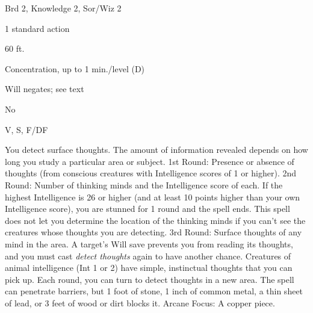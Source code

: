
\begin{description*}
\item[Level:] Brd 2, Knowledge 2, Sor/Wiz 2
\item[Casting Time:] 1 standard action
\item[Range:] 60 ft.
\item[Duration:] Concentration, up to 1 min./level (D)
\item[Saving Throw:] Will negates; see text
\item[Spell Resistance:] No
\item[Components:] V, S, F/DF
\end{description*}

You detect surface thoughts. The amount of information revealed depends on how
long you study a particular area or subject.
1st Round: Presence or absence of thoughts (from conscious creatures with
Intelligence scores of 1 or higher).
2nd Round: Number of thinking minds and the Intelligence score of each.
If the highest Intelligence is 26 or higher (and at least 10 points higher than
your own Intelligence score), you are stunned for 1 round and the spell ends. This
spell does not let you determine the location of the thinking minds if you can't
see the creatures whose thoughts you are detecting.
3rd Round: Surface thoughts of any mind in the area. A target's Will save
prevents you from reading its thoughts, and you must cast \textit{detect thoughts
}again to have another chance. Creatures of animal intelligence (Int 1 or 2) have
simple, instinctual thoughts that you can pick up.
Each round, you can turn to detect thoughts in a new area. The spell can penetrate
barriers, but 1 foot of stone, 1 inch of common metal, a thin sheet of lead, or
3 feet of wood or dirt blocks it.
Arcane Focus: A copper piece.